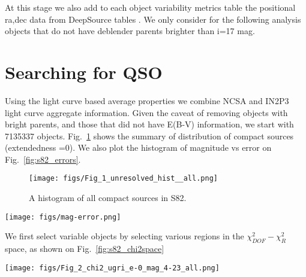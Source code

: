 \documentclass[fleqn,usenatbib]{mnras}  %
\begin{document}
At this stage we also add to each object variability metrics table the positional ra,dec data from DeepSource tables . We only consider for the following analysis objects that do not have deblender parents brighter than i=17 mag. 


\section{Searching for QSO}

Using the light curve based average properties we combine NCSA and IN2P3 light curve aggregate information. Given the caveat of removing objects with bright parents, and those that did not have E(B-V) information, we start with 7135337 objects. Fig.~\ref{fig:s82_histogram} shows the summary of distribution of compact sources (extendedness =0). We also plot the histogram of magnitude vs error on Fig.~\ref{fig:s82_errors}.

\begin{figure}
 \texttt{[image: figs/Fig\_1\_unresolved\_hist\_\_all.png]}
 \caption{A histogram of all compact sources in S82.}
 \label{fig:s82_histogram}
\end{figure}

\begin{figure*}
\texttt{[image: figs/mag-error.png]}
\caption{Mean-based magnitudes vs errors for S82 objects with extendedness=0 (top), and extendedness=1 (bottom). From left to right, data in u,g,r,i,z filters. The color scale corresponds to $\log_{10}(\mathrm{counts})$. The fainter the object, the higher the mean error (psfMeanErr is based on psfMeanFluxErr, which is the error on the weighted mean of fluxes). }
\label{fig:s82_errors}
\end{figure*}


We first select variable objects by selecting various regions in the $\chi^{2}_{DOF}-\chi^{2}_{R}$ space, as shown on Fig.~\ref{fig:s82_chi2space}

\begin{figure*}
 \texttt{[image: figs/Fig\_2\_chi2\_ugri\_e-0\_mag\_4-23\_all.png]}
 \caption{$\chi^{2}_{DOF}-\chi^{2}_{R}$ space calculated for data in u,g,r,i  filters. Region S1 includes highly variable objects, S2a a transitional region, and S2b a region with possible variable candidates. We select variable candidates from S1 region, based on the g-band $\chi^{2}$. }
 \label{fig:s82_chi2space}
\end{figure*}
\end{document}
